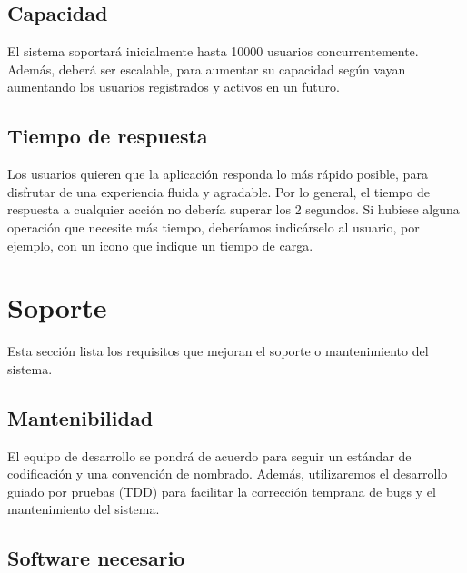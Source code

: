 \documentclass[12pt, a4paper, titlepage]{article}
\begin{document}
\subsection{Capacidad}

El sistema soportará inicialmente hasta 10000 usuarios concurrentemente. Además, deberá ser escalable, para aumentar su capacidad según vayan aumentando los usuarios registrados y activos en un futuro.

\subsection{Tiempo de respuesta}

Los usuarios quieren que la aplicación responda lo más rápido posible, para disfrutar de una experiencia fluida y agradable. Por lo general, el tiempo de respuesta a cualquier acción no debería superar los 2 segundos. Si hubiese alguna operación que necesite más tiempo, deberíamos indicárselo al usuario, por ejemplo, con un icono que indique un tiempo de carga.

\section{Soporte}

Esta sección lista los requisitos que mejoran el soporte o mantenimiento del sistema.

\subsection{Mantenibilidad}

El equipo de desarrollo se pondrá de acuerdo para seguir un estándar de codificación y una convención de nombrado. Además, utilizaremos el desarrollo guiado por pruebas (TDD) para facilitar la corrección temprana de bugs y el mantenimiento del sistema.

\subsection{Software necesario}
\end{document}
